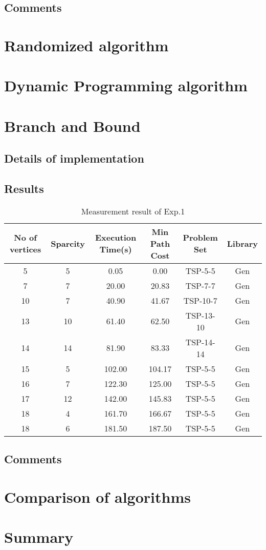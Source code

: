 \documentclass[a4paper, 11pt]{article}
\begin{document}
\subsection{Comments}
\pagebreak

\section{Randomized algorithm}


\section{Dynamic Programming algorithm}


\section{Branch and Bound}

\subsection{Details of implementation}

\subsection{Results}

\begin{table}[!h]
\centering
\begin{tabular}{|c|c|c|c|c|c|}
	\hline
	No of vertices & Sparcity  & Execution Time(s) & Min Path Cost & Problem Set & Library  \\
	\hline\hline
	5 & 5 & 0.05 & 0.00 & TSP-5-5 & Gen\\
	\hline
	7 & 7 & 20.00 &20.83& TSP-7-7 & Gen\\
	\hline
	10 & 7 & 40.90 &41.67& TSP-10-7 & Gen\\
	\hline
	13 & 10 & 61.40 &62.50& TSP-13-10 & Gen\\
	\hline
	14 & 14 & 81.90 &83.33& TSP-14-14 & Gen\\
	\hline
	15 & 5 & 102.00 &104.17& TSP-5-5 & Gen\\
	\hline
	16 & 7 & 122.30 &125.00& TSP-5-5 & Gen\\
	\hline
	17 & 12 & 142.00 &145.83& TSP-5-5 & Gen\\
	\hline
	18 & 4 & 161.70 &166.67& TSP-5-5 & Gen\\
	\hline
	18 & 6 & 181.50 &187.50& TSP-5-5 & Gen\\
	\hline
\end{tabular}
\caption{Measurement result of Exp.1}
\label{t1}
\end{table}


\subsection{Comments}
\pagebreak
\section{Comparison of algorithms}

\section{Summary}






\end{document}
